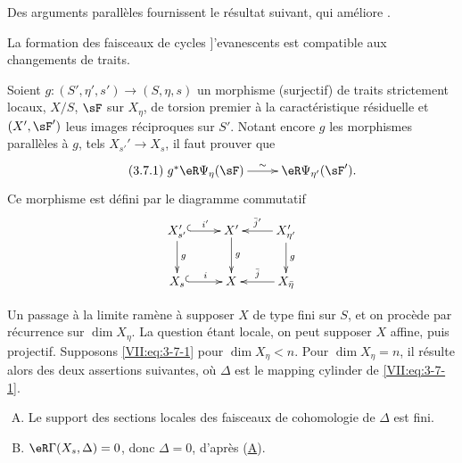 Des arguments parallèles fournissent le résultat suivant, qui améliore 
\cite[XIII 2.1.12, 2.4.2]{sga7}. 





\begin{proposition_}\label{VII:3-7}
La formation des faisceaux de cycles ]'evanescents est compatible aux 
changements de traits. 
\end{proposition_}

Soient $g:(S',\eta',s') \to (S,\eta,s)$ un morphisme (surjectif) de traits 
strictement locaux, $X/S$, $\sF$ sur $X_\eta$, de torsion premier à la 
caractéristique résiduelle et $(X',\sF')$ leus images réciproques sur 
$S'$. Notant encore $g$ les morphismes parallèles à $g$, tels 
$X_{s'}' \to X_s$, il faut prouver que 
\begin{equation*}\tag{3.7.1}\label{VII:eq:3-7-1}
\xymatrix{
  g^\ast \eR\Psi_\eta(\sF) \ar[r]^-\sim 
    & \eR\Psi_{\eta'}(\sF') \text{.} 
}
\end{equation*}
Ce morphisme est défini par le diagramme commutatif 
\[\xymatrix{
  X_{s'}' \ar@{^{(}->}[r]^-{i'} \ar[d]^-g 
    & X' \ar[d]^-g 
    & X_{\eta'}' \ar[l]_-{\bar j'} \ar[d]^-g \\
  X_s \ar@{^{(}->}[r]^-i 
    & X 
    & \ar[l]_-{\bar j} X_{\bar\eta} 
}\]

Un passage à la limite ramène à supposer $X$ de type fini sur $S$, et on 
procède par récurrence sur $\dim{X_\eta}$. La question étant locale, on 
peut supposer $X$ affine, puis projectif. Supposons \eqref{VII:eq:3-7-1} pour 
$\dim{X_\eta}<n$. Pour $\dim{X_\eta}=n$, il résulte alors des deux 
assertions suivantes, où $\Delta$ est le mapping cylinder de 
\eqref{VII:eq:3-7-1}. 

\begin{enumerate}[(A)]
  \item Le support des sections locales des faisceaux de cohomologie de 
    $\Delta$ est fini. 
    \hypertarget{VII:3-A}{}
  \item $\eR\Gamma(X_s,\Delta)=0$, donc $\Delta=0$, d'après 
    (\hyperlink{VII:3-A}{A}). 
    \hypertarget{VII:3-B}{}
\end{enumerate}





\subsection{}\label{VII:3-8}

